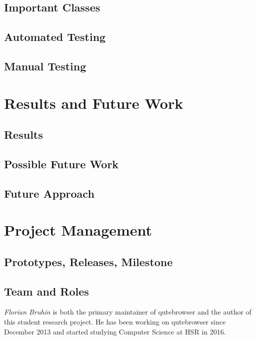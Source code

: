 \documentclass[a4paper,parskip=full]{scrreprt}
\begin{document}
\section{Important Classes}

\section{Automated Testing}

\section{Manual Testing}


\chapter{Results and Future Work}

\section{Results}

\section{Possible Future Work}

\section{Future Approach}


\chapter{Project Management}

\section{Prototypes, Releases, Milestone}

\section{Team and Roles}
\emph{Florian Bruhin} is both the primary maintainer of qutebrowser and the
author of this student research project. He has been working on qutebrowser since
December 2013 and started studying Computer Science at HSR in 2016.
\end{document}
